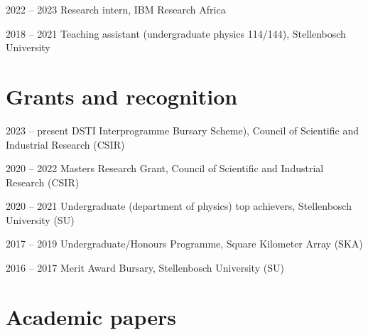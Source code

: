 \documentclass[10pt]{extreport}
\begin{document}
\begin{tablist}
	\item[2022 -- 2023]  \tab{} Research intern, IBM Research Africa
	\item[2018 -- 2021] \tab{} Teaching assistant (undergraduate physics 114/144), Stellenbosch University
\end{tablist}

\section*{Grants and recognition}

\begin{tablist}

	\item[2023 -- present]  \tab{} DSTI Interprogramme Bursary Scheme), Council of Scientific and Industrial Research (CSIR)
	\item[2020 -- 2022]  \tab{} Masters Research Grant, Council of Scientific and Industrial Research (CSIR)
	\item[2020 -- 2021] \tab{} Undergraduate (department of physics) top achievers, Stellenbosch University (SU)
	\item[2017 -- 2019]  \tab{} Undergraduate/Honours Programme, Square Kilometer Array (SKA)
	\item[2016 -- 2017]  \tab{} Merit Award Bursary, Stellenbosch University (SU)
\end{tablist}

\section*{Academic papers}
\end{document}
